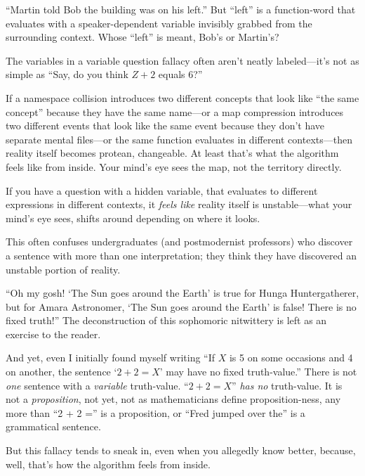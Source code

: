 { ``Martin told Bob the building was on his
left.'' But
``left'' is a function-word that
evaluates with a speaker-dependent variable invisibly grabbed from the
surrounding context. Whose ``left''
is meant, Bob's or Martin's?


 The variables in a variable question fallacy often
aren't neatly labeled---it's not as
simple as ``Say, do you think $Z + 2$ equals
6?''


 If a namespace collision introduces two different concepts that
look like ``the same concept''
because they have the same name---or a map compression introduces two
different events that look like the same event because they
don't have separate mental files---or the same function
evaluates in different contexts---then reality itself becomes protean,
changeable. At least that's what the algorithm feels
like from inside. Your mind's eye sees the map, not the
territory directly.


 If you have a question with a hidden variable, that evaluates to
different expressions in different contexts, it \textit{feels like}
reality itself is unstable---what your mind's eye sees,
shifts around depending on where it looks.


 This often confuses undergraduates (and postmodernist professors)
who discover a sentence with more than one interpretation; they think
they have discovered an unstable portion of reality.


 ``Oh my gosh! `The Sun goes around
the Earth' is true for Hunga Huntergatherer, but for
Amara Astronomer, `The Sun goes around the
Earth' is false! There is no fixed
truth!'' The deconstruction of this sophomoric
nitwittery is left as an exercise to the reader.


 And yet, even I initially found myself writing
``If $X$ is 5 on some occasions and 4 on another, the
sentence `$2 + 2 = X$' may have no fixed
truth-value.'' There is not \textit{one} sentence
with a \textit{variable} truth-value. ``$2 + 2 =
X$'' \textit{has no} truth-value. It is not a
\textit{proposition}, not yet, not as mathematicians define
proposition-ness, any more than ``2 + 2
='' is a proposition, or ``Fred
jumped over the'' is a grammatical sentence.


 But this fallacy tends to sneak in, even when you allegedly know
better, because, well, that's how the algorithm feels
from inside.

\myendsectiontext



}
